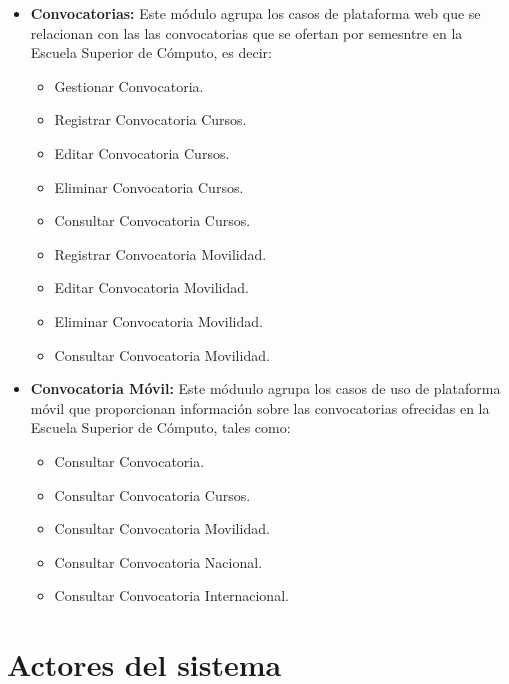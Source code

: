 \begin{itemize}
\item {\bf Convocatorias:} Este módulo agrupa los casos de plataforma web  que se relacionan con las las convocatorias que se ofertan por semesntre en la Escuela Superior de Cómputo, es decir:
\begin{itemize}
	\item Gestionar Convocatoria.
	\item Registrar Convocatoria Cursos.
	\item Editar Convocatoria Cursos.
	\item Eliminar Convocatoria Cursos.
	\item Consultar Convocatoria Cursos.
	\item Registrar Convocatoria Movilidad.
	\item Editar Convocatoria Movilidad.
	\item Eliminar Convocatoria Movilidad.
	\item Consultar Convocatoria Movilidad.
\end{itemize}

	\item {\bf Convocatoria Móvil:} Este móduulo agrupa los casos de uso de plataforma móvil que proporcionan información sobre las convocatorias ofrecidas en la Escuela Superior de Cómputo, tales como:
\begin{itemize}
	\item Consultar Convocatoria.
	\item Consultar Convocatoria Cursos.
	\item Consultar Convocatoria Movilidad.
		\item Consultar Convocatoria Nacional.
			\item Consultar Convocatoria Internacional.
\end{itemize}


    \end{itemize}

\section{Actores del sistema}\label{sec:Comportamiento:ActoresSistema}

